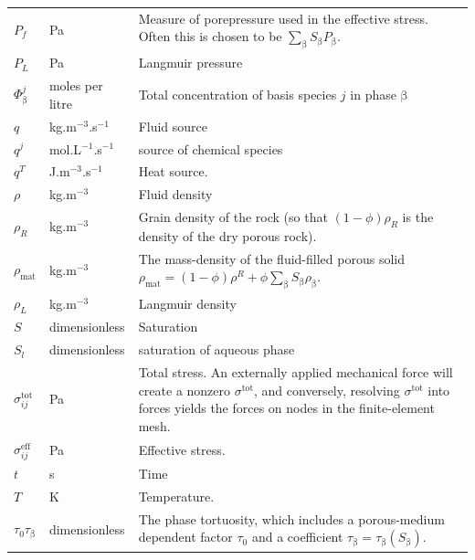 \documentclass[12pt]{report}
\def\phase{\mathrm{\beta}}
\begin{document}
\begin{longtable}{llp{10cm}}
$P_{f}$ & Pa & Measure of porepressure used in the effective stress.
Often this is chosen to be $\sum_{\phase}S_{\phase}P_{\phase}$. \\

$P_{L}$ & Pa & Langmuir pressure \\

$\Phi_{\phase}^{j}$ & moles per litre & Total concentration of basis
species $j$ in phase $\phase$ \\

$q$ & kg.m$^{-3}$.s$^{-1}$ & Fluid source \\

$q^{j}$ & mol.L$^{-1}$.s$^{-1}$ & source of chemical species \\

$q^{T}$ & J.m$^{-3}$.s$^{-1}$ & Heat source. \\

$\rho$ & kg.m$^{-3}$ & Fluid density \\

$\rho_{R}$ & kg.m$^{-3}$ & Grain density of the rock (so that
$(1-\phi)\rho_{R}$ is the density of the dry porous rock). \\

$\rho_{\mathrm{mat}}$ & kg.m$^{-3}$ & The mass-density of the
fluid-filled porous solid $\rho_{\mathrm{mat}} = (1 - \phi)\rho^{R} +
\phi\sum_{\phase}S_{\phase}\rho_{\phase}$. \\

$\rho_{L}$ & kg.m$^{-3}$ & Langmuir density\\

$S$ & dimensionless & Saturation \\

$S_{l}$ & dimensionless & saturation of aqueous phase \\


$\sigma^{\mathrm{tot}}_{ij}$ & Pa & Total stress.  An
externally applied mechanical force will create a nonzero
$\sigma^{\mathrm{tot}}$, and conversely, resolving
$\sigma^{\mathrm{tot}}$ into forces yields the forces on nodes in the
finite-element mesh. \\

$\sigma^{\mathrm{eff}}_{ij}$ & Pa & Effective stress. \\

$t$ & s & Time \\

$T$ & K & Temperature. \\

$\tau_{0}\tau_{\phase}$ & dimensionless & The phase tortuosity, which
includes a porous-medium dependent factor $\tau_{0}$ and a coefficient
$\tau_{\phase}=\tau_{\phase}(S_{\phase})$. \\


\end{longtable}
\end{document}
